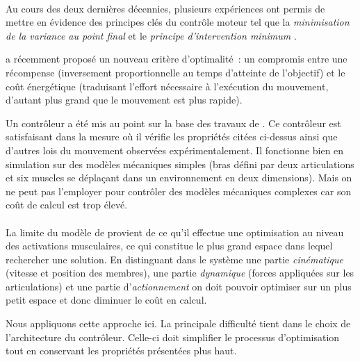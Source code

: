 \documentclass[pdftex,a4paper,11pt]{article}
\begin{document}

\paragraph{}
Au cours des deux dernières décennies, plusieurs expériences ont permis de
mettre en évidence des principes clés du contrôle moteur tel que la {\em
minimisation de la variance au point final} \cite{harris98_N} et le {\em
principe d'intervention minimum} \cite{todorov02_NN,todorov03_NIPS}.

\cite{rigoux11} a récemment proposé un nouveau critère d'optimalité~: un compromis
entre une récompense (inversement proportionnelle au temps d'atteinte de
l'objectif) et le coût énergétique (traduisant l'effort nécessaire à
l'exécution du mouvement, d'autant plus grand que le mouvement est plus rapide).

Un contrôleur a été mis au point sur la base des travaux de \cite{rigoux11}. Ce
contrôleur est satisfaisant dans la mesure où il vérifie les propriétés citées
ci-dessus ainsi que d'autres lois du mouvement observées expérimentalement.
Il fonctionne bien en simulation sur des modèles mécaniques simples (bras
défini par deux articulations et six muscles se déplaçant dans un environnement
en deux dimensions). Mais on ne peut pas l'employer pour contrôler des modèles
mécaniques complexes car son coût de calcul est trop élevé.

\paragraph{}
La limite du modèle de \cite{rigoux11} provient de ce qu'il effectue une
optimisation au niveau des activations musculaires, ce qui constitue le plus
grand espace dans lequel rechercher une solution. En distinguant dans le
système une partie {\em cinématique} (vitesse et position des membres), une
partie {\em dynamique} (forces appliquées sur les articulations) et une partie
d'{\em actionnement} on doit pouvoir optimiser sur un plus petit espace et donc
diminuer le coût en calcul.

Nous appliquons cette approche ici. La principale difficulté tient dans
le choix de l'architecture du contrôleur. Celle-ci doit simplifier le processus
d'optimisation tout en conservant les propriétés présentées plus haut.
\end{document}
